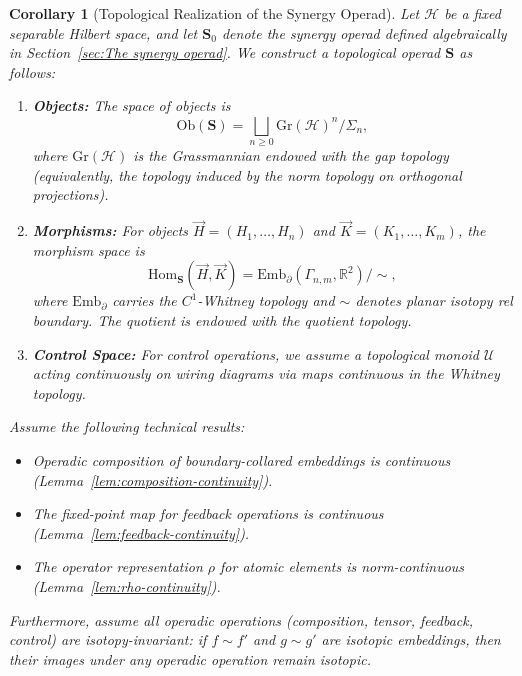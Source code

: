 \documentclass[11pt]{article}
\newtheorem{corollary}{Corollary}
\begin{document}
\begin{corollary}[Topological Realization of the Synergy Operad]\label{cor:topological-realization}
Let $\mathcal{H}$ be a fixed separable Hilbert space, and let $\mathbf{S}_0$ denote the synergy operad defined algebraically in Section~\ref{sec:The synergy operad}. We construct a topological operad $\mathbf{S}$ as follows:

\begin{enumerate}
    \item \textbf{Objects:} The space of objects is
    \[
        \mathrm{Ob}(\mathbf{S}) = \bigsqcup_{n \ge 0} \mathrm{Gr}(\mathcal{H})^n / \Sigma_n,
    \]
    where $\mathrm{Gr}(\mathcal{H})$ is the Grassmannian endowed with the \emph{gap topology} (equivalently, the topology induced by the norm topology on orthogonal projections).

    \item \textbf{Morphisms:} For objects $\vec{H} = (H_1, \dots, H_n)$ and $\vec{K} = (K_1, \dots, K_m)$, the morphism space is
    \[
        \mathrm{Hom}_{\mathbf{S}}(\vec{H}, \vec{K})
        = \mathrm{Emb}_\partial(\Gamma_{n,m}, \mathbb{R}^2) / \!\!\sim,
    \]
    where $\mathrm{Emb}_\partial$ carries the $C^1$-Whitney topology and $\sim$ denotes planar isotopy rel boundary. The quotient is endowed with the quotient topology.

    \item \textbf{Control Space:} For control operations, we assume a topological monoid $\mathcal{U}$ acting continuously on wiring diagrams via maps continuous in the Whitney topology.
\end{enumerate}

Assume the following technical results:
\begin{itemize}
    \item[(L1)] Operadic composition of boundary-collared embeddings is continuous (Lemma~\ref{lem:composition-continuity}).
    \item[(L2)] The fixed-point map for feedback operations is continuous (Lemma~\ref{lem:feedback-continuity}).
    \item[(L3)] The operator representation $\rho$ for atomic elements is norm-continuous (Lemma~\ref{lem:rho-continuity}).
\end{itemize}

Furthermore, assume all operadic operations (composition, tensor, feedback, control) are \emph{isotopy-invariant}: if $f \sim f'$ and $g \sim g'$ are isotopic embeddings, then their images under any operadic operation remain isotopic.


\end{corollary}
\end{document}
